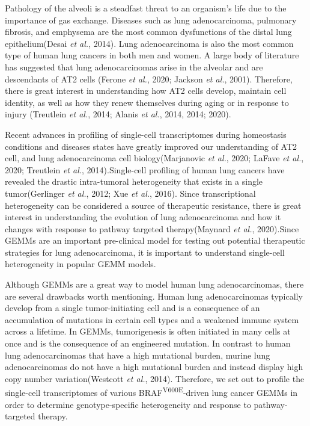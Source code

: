 Pathology of the alveoli is a steadfast threat to an organism's life due to the importance of gas exchange. Diseases such as lung adenocarcinoma, pulmonary fibrosis, and emphysema are the most common dysfunctions of the distal lung epithelium(Desai \emph{et al.}, 2014). Lung adenocarcinoma is also the most common type of human lung cancers in both men and women. A large body of literature has suggested that lung adenocarcinomas arise in the alveolar and are descendants of AT2 cells (Ferone \emph{et al.}, 2020; Jackson \emph{et al.}, 2001). Therefore, there is great interest in understanding how AT2 cells develop, maintain cell identity, as well as how they renew themselves during aging or in response to injury (Treutlein \emph{et al.}, 2014; Alanis \emph{et al.}, 2014, 2014; 2020).

Recent advances in profiling of single-cell transcriptomes during homeostasis conditions and diseases states have greatly improved our understanding of AT2 cell, and lung adenocarcinoma cell biology(Marjanovic \emph{et al.}, 2020; LaFave \emph{et al.}, 2020; Treutlein \emph{et al.}, 2014).Single-cell profiling of human lung cancers have revealed the drastic intra-tumoral heterogeneity that exists in a single tumor(Gerlinger \emph{et al.}, 2012; Xue \emph{et al.}, 2016). Since transcriptional heterogeneity can be considered a source of therapeutic resistance, there is great interest in understanding the evolution of lung adenocarcinoma and how it changes with response to pathway targeted therapy(Maynard \emph{et al.}, 2020).Since GEMMs are an important pre-clinical model for testing out potential therapeutic strategies for lung adenocarcinoma, it is important to understand single-cell heterogeneity in popular GEMM models.

Although GEMMs are a great way to model human lung adenocarcinomas, there are several drawbacks worth mentioning. Human lung adenocarcinomas typically develop from a single tumor-initiating cell and is a consequence of an accumulation of mutations in certain cell types and a weakened immune system across a lifetime. In GEMMs, tumorigenesis is often initiated in many cells at once and is the consequence of an engineered mutation. In contrast to human lung adenocarcinomas that have a high mutational burden, murine lung adenocarcinomas do not have a high mutational burden and instead display high copy number variation(Westcott \emph{et al.}, 2014). Therefore, we set out to profile the single-cell transcriptomes of various BRAF\textsuperscript{V600E}-driven lung cancer GEMMs in order to determine genotype-specific heterogeneity and response to pathway-targeted therapy.

